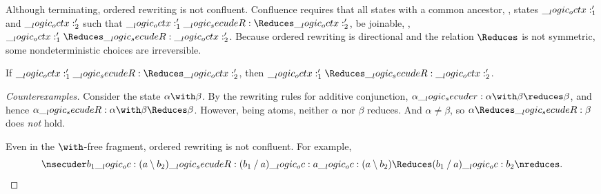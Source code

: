 Although terminating, ordered rewriting is not confluent.
Confluence requires that all states with a common ancestor, \ie, states $\__logic_octx:'_1$ and $\__logic_octx:'_2$ such that $\octx'_1 \secudeR\Reduces \octx'_2$, be joinable, \ie, $\octx'_1 \Reduces\secudeR \octx'_2$.
Because ordered rewriting is directional and the relation $\Reduces$ is not symmetric, some nondeterministic choices are irreversible.%
%
\begin{falseclaim}[Confluence]
  If\/ $\octx'_1 \secudeR\Reduces \octx'_2$, then $\octx'_1 \Reduces\secudeR \octx'_2$.
\end{falseclaim}
%
\begin{proof}[Counterexamples]
  Consider the state $\alpha \with \beta$.
  By the rewriting rules for additive conjunction, $\alpha \secuder \alpha \with \beta \reduces \beta$, and hence $\alpha \secudeR \alpha \with \beta \Reduces \beta$.
  However, being atoms, neither $\alpha$ nor $\beta$ reduces.
  And $\alpha \neq \beta$, so $\alpha \Reduces\secudeR \beta$ does \emph{not} hold.

  Even in the $\with$-free fragment, ordered rewriting is not confluent.
  For example,
  \begin{equation*}
    \nsecuder b_1 \oc (a \limp b_2) \secudeR (b_1 \pmir a) \oc a \oc (a \limp b_2) \Reduces (b_1 \pmir a) \oc b_2 \nreduces
    .
    \qedhere
  \end{equation*}
\end{proof}








